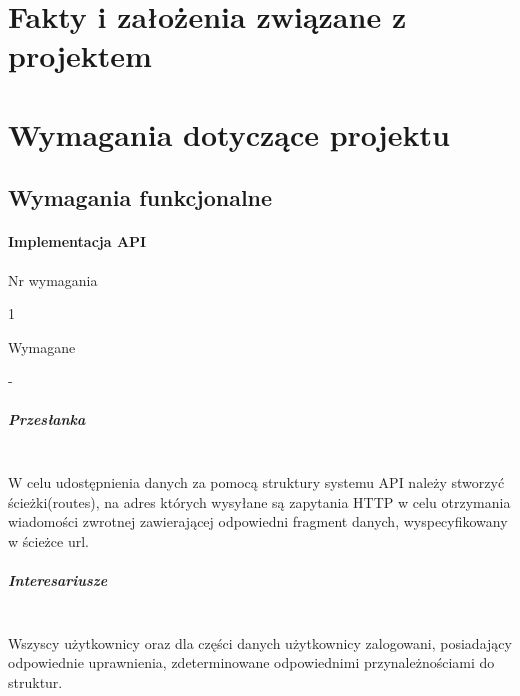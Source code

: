 \documentclass[eng,printmode]{mgr}
\begin{document}
\chapter{Fakty i założenia związane z projektem }

\chapter{Wymagania dotyczące projektu}

\section{Wymagania funkcjonalne}

\subsubsection{Implementacja API}
\begin{labeling}{Nr wymagania}
\item [Nr wymagania:] 1
\item [Typ:] Wymagane
\item [Powiązania:] -
\end{labeling}

\paragraph{Przesłanka}\ \\
W celu udostępnienia danych za pomocą struktury systemu API należy stworzyć ścieżki(routes), na adres których wysyłane są zapytania HTTP w celu otrzymania wiadomości zwrotnej zawierającej odpowiedni fragment danych, wyspecyfikowany w ścieżce url.

\paragraph{Interesariusze}\ \\
Wszyscy użytkownicy oraz dla części danych użytkownicy zalogowani, posiadający odpowiednie uprawnienia, zdeterminowane odpowiednimi przynależnościami do struktur.
\end{document}

